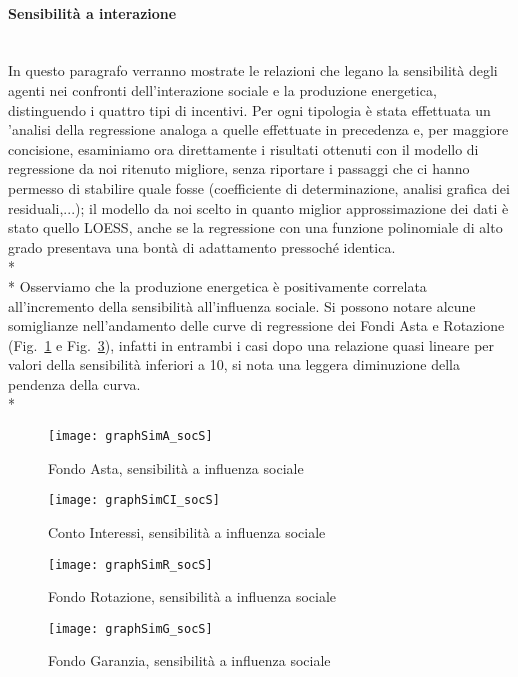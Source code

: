 \documentclass[12pt,a4paper,openright,twoside]{report}
\newcommand{\myparagraph}[1]{\paragraph{#1}\mbox{}\\}
\begin{document}
\myparagraph{Sensibilità a interazione}

In questo paragrafo verranno mostrate le relazioni che legano la sensibilità degli agenti nei confronti dell'interazione sociale e la produzione energetica, distinguendo i quattro tipi di incentivi. Per ogni tipologia è stata effettuata un 'analisi della regressione analoga a quelle effettuate in precedenza e, per maggiore concisione, esaminiamo ora direttamente i risultati ottenuti con il modello di regressione da noi ritenuto migliore, senza riportare i passaggi che ci hanno permesso di stabilire quale fosse (coefficiente di determinazione, analisi grafica dei residuali,...); il modello da noi scelto in quanto miglior approssimazione dei dati è stato quello LOESS, anche se la regressione con una funzione polinomiale di alto grado presentava una bontà di adattamento pressoché identica.\\* \\*
Osserviamo che  la produzione energetica è positivamente correlata all'incremento della sensibilità all'influenza sociale. Si possono notare alcune somiglianze nell'andamento delle curve di regressione dei Fondi Asta e Rotazione (Fig.~\ref{graphAsocS} e Fig.~\ref{graphRsocS}), infatti in entrambi i casi dopo una relazione quasi lineare per valori della sensibilità inferiori a 10, si nota una leggera diminuzione della pendenza della curva. \\*

\begin{figure}[H]
	\centering
	\texttt{[image: graphSimA\_socS]}
	\caption{Fondo Asta, sensibilità a influenza sociale}
	\label{graphAsocS}
\end{figure}

\begin{figure}[hbt]
	\centering
	\texttt{[image: graphSimCI\_socS]}
	\caption{Conto Interessi, sensibilità a influenza sociale}
	\label{graphCIsocS}
\end{figure}

\begin{figure}[H]
	\centering
	\texttt{[image: graphSimR\_socS]}
	\caption{Fondo Rotazione, sensibilità a influenza sociale}
	\label{graphRsocS}
\end{figure}

\begin{figure}[hbt]
	\centering
	\texttt{[image: graphSimG\_socS]}
	\caption{Fondo Garanzia, sensibilità a influenza sociale}
	\label{graphGsocS}
\end{figure}
\end{document}
